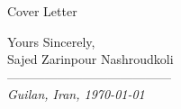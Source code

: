 \begin{cSection}{Cover Letter}

	\vspace*{1em}
Yours Sincerely,\\
Sajed Zarinpour Nashroudkoli\\
\normalsize
---------------------------------------\\
\tiny\textit{\scriptsize Guilan, Iran, \today}
\normalsize
\end{cSection}